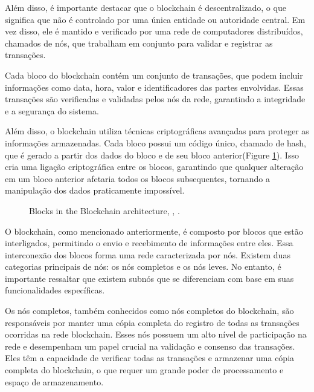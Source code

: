 Além disso, é importante destacar que o blockchain é descentralizado, o que significa que não é controlado por uma única entidade ou autoridade central. Em vez disso, ele é mantido e verificado por uma rede de computadores distribuídos, chamados de nós, que trabalham em conjunto para validar e registrar as transações.\cite{tapscott2016technology}

Cada bloco do blockchain contém um conjunto de transações, que podem incluir informações como data, hora, valor e identificadores das partes envolvidas. Essas transações são verificadas e validadas pelos nós da rede, garantindo a integridade e a segurança do sistema.\cite{Blockchain-Satochi}

Além disso, o blockchain utiliza técnicas criptográficas avançadas para proteger as informações armazenadas. Cada bloco possui um código único, chamado de hash, que é gerado a partir dos dados do bloco e de seu bloco anterior(Figure \ref{Blockchain-arquiteture}). Isso cria uma ligação criptográfica entre os blocos, garantindo que qualquer alteração em um bloco anterior afetaria todos os blocos subsequentes, tornando a manipulação dos dados praticamente impossível.\cite{swan2015blockchain}

\begin{figure}[!htb]
\centering
{}
\caption{Blocks in the Blockchain architecture, \cite{9402747}, .}
\label{Blockchain-arquiteture}
\end{figure}

O blockchain, como mencionado anteriormente, é composto por blocos que estão interligados, permitindo o envio e recebimento de informações entre eles. Essa interconexão dos blocos forma uma rede caracterizada por nós. Existem duas categorias principais de nós: os nós completos e os nós leves. No entanto, é importante ressaltar que existem subnós que se diferenciam com base em suas funcionalidades específicas.

Os nós completos, também conhecidos como nós completos do blockchain, são responsáveis por manter uma cópia completa do registro de todas as transações ocorridas na rede blockchain. Esses nós possuem um alto nível de participação na rede e desempenham um papel crucial na validação e consenso das transações. Eles têm a capacidade de verificar todas as transações e armazenar uma cópia completa do blockchain, o que requer um grande poder de processamento e espaço de armazenamento.\cite{9402747}

